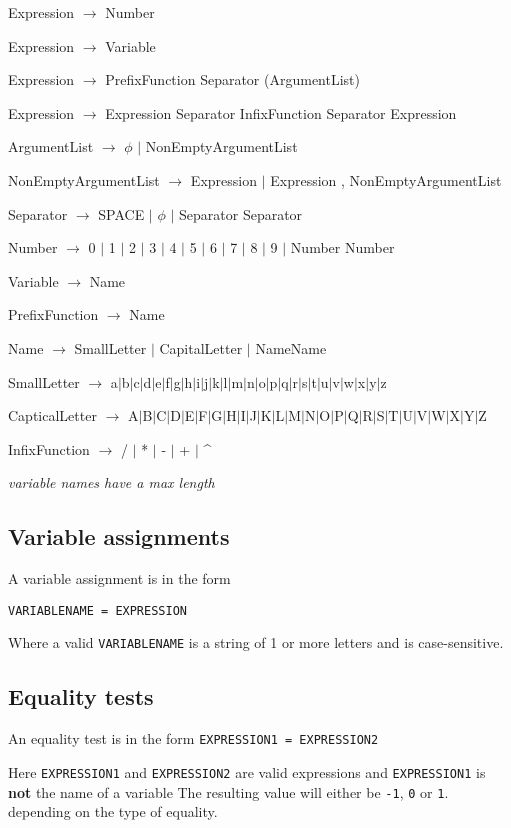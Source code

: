 \documentclass[11pt,a4paper]{article}
\begin{document}
Expression \(\rightarrow\) Number

Expression \(\rightarrow\) Variable

Expression \(\rightarrow\) PrefixFunction Separator (ArgumentList)

Expression \(\rightarrow\) Expression Separator InfixFunction Separator Expression

ArgumentList \(\rightarrow\) \(\phi\) $\mid$  NonEmptyArgumentList

NonEmptyArgumentList  \(\rightarrow\)  Expression $\mid$ Expression , NonEmptyArgumentList

Separator \(\rightarrow\) SPACE $\mid$ \(\phi\) $\mid$ Separator Separator

Number \(\rightarrow\) 0 $\mid$ 1 $\mid$ 2 $\mid$ 3 $\mid$ 4 $\mid$ 5 $\mid$ 6 $\mid$ 7 $\mid$ 8 $\mid$ 9 $\mid$ Number Number

Variable \(\rightarrow\) Name

PrefixFunction \(\rightarrow\) Name

Name \(\rightarrow\) SmallLetter $\mid$ CapitalLetter $\mid$ NameName

SmallLetter \(\rightarrow\) a$\mid$b$\mid$c$\mid$d$\mid$e$\mid$f$\mid$g$\mid$h$\mid$i$\mid$j$\mid$k$\mid$l$\mid$m$\mid$n$\mid$o$\mid$p$\mid$q$\mid$r$\mid$s$\mid$t$\mid$u$\mid$v$\mid$w$\mid$x$\mid$y$\mid$z

CapticalLetter \(\rightarrow\) A$\mid$B$\mid$C$\mid$D$\mid$E$\mid$F$\mid$G$\mid$H$\mid$I$\mid$J$\mid$K$\mid$L$\mid$M$\mid$N$\mid$O$\mid$P$\mid$Q$\mid$R$\mid$S$\mid$T$\mid$U$\mid$V$\mid$W$\mid$X$\mid$Y$\mid$Z

InfixFunction \(\rightarrow\) / $\mid$ * $\mid$ - $\mid$ + $\mid$ \^{}

\emph{variable names have a max length}


\subsection{Variable assignments}
A variable assignment is in the form

\texttt{VARIABLENAME = EXPRESSION}

Where a valid \texttt{VARIABLENAME} is a string of 1 or more letters and
is case-sensitive.
\subsection{Equality tests}
An equality test is in the form
\texttt{EXPRESSION1 = EXPRESSION2}


Here \texttt{EXPRESSION1} and \texttt{EXPRESSION2} are valid
expressions and \texttt{EXPRESSION1} is \textbf{not} the name of a
variable The resulting value will either be \texttt{-1}, \texttt{0} or
\texttt{1}. depending on the type of equality.
\end{document}

